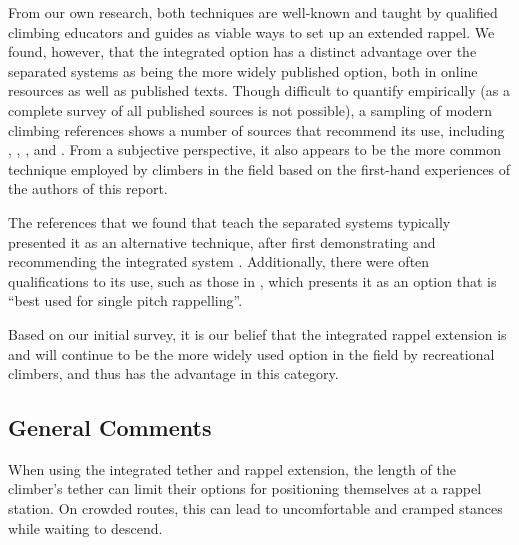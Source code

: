 \documentclass[nonacm,acmtog]{acmart}
\begin{document}
   From our own research, both techniques are well-known and taught by
   qualified climbing educators and guides as viable ways to set up an extended
   rappel.  We found, however, that the integrated option has a distinct
   advantage over the separated systems as being the more widely published
   option, both in online resources as well as published texts.  Though
   difficult to quantify empirically (as a complete survey of all published
   sources is not possible), a sampling of modern climbing references shows a
   number of sources that recommend its use, including
   \cite[pp.~213-214]{foth}, \cite[p.~25]{sr2}, \cite[pp.~219-220]{spi},
   \cite{vid:amga-ext-rap} and \cite{vid:siet-ext-rap}.  From a subjective
   perspective, it also appears to be the more common technique employed by
   climbers in the field based on the first-hand experiences of the authors of
   this report.

   The references that we found that teach the separated systems typically
   presented it as an alternative technique, after first demonstrating and
   recommending the integrated system \cite{vid:siet-ext-rap}.  Additionally,
   there were often qualifications to its use, such as those in
   \cite{fmg-extrap}, which presents it as an option that is ``best used for
   single pitch rappelling''.

   Based on our initial survey, it is our belief that the integrated rappel
   extension is and will continue to be the more widely used option in the
   field by recreational climbers, and thus has the advantage in this category.



\subsection{General Comments}
\label{sec:general}

   When using the integrated tether and rappel extension, the length of the
   climber’s tether can limit their options for positioning themselves at a
   rappel station.  On crowded routes, this can lead to uncomfortable and
   cramped stances while waiting to descend.
\end{document}
